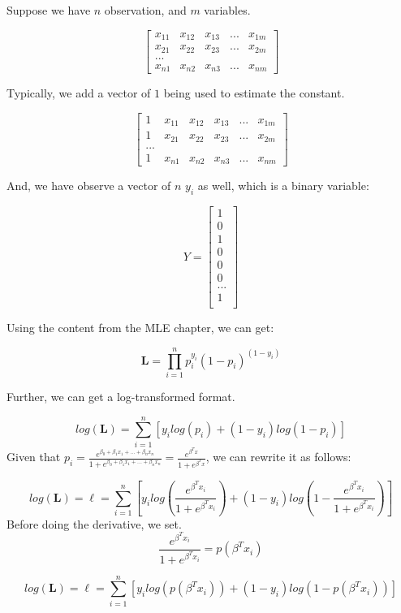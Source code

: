 \documentclass[]{book}
\begin{document}
Suppose we have \(n\) observation, and \(m\) variables.

\[\begin{bmatrix}
x_{11} & x_{12} & x_{13} & ... & x_{1m}\\
x_{21} & x_{22} & x_{23} & ... & x_{2m} \\
...\\
x_{n1} & x_{n2} & x_{n3} & ... & x_{nm}
\end{bmatrix}\]

Typically, we add a vector of \(1\) being used to estimate the constant.

\[\begin{bmatrix}
1 & x_{11} & x_{12} & x_{13} & ... & x_{1m}\\
1 & x_{21} & x_{22} & x_{23} & ... & x_{2m} \\
...\\
1 & x_{n1} & x_{n2} & x_{n3} & ... & x_{nm}
\end{bmatrix}\]

And, we have observe a vector of \(n\) \(y_i\) as well, which is a binary variable:

\[Y = \begin{bmatrix}1 \\
0 \\
1 \\
0 \\
0 \\
0 \\
...\\
1 \\
\end{bmatrix}\]

Using the content from the MLE chapter, we can get:

\[\mathbf{L}=\prod_{i=1}^{n} p_i^{ y_i}(1-p_i)^{(1-y_i)}\]

Further, we can get a log-transformed format.

\[log (\mathbf{L})=\sum_{i=1}^{n}[y_i log (p_i) + (1-y_i) log(1-p_i)]\]
Given that \(p_i=\frac{e^{\beta_0+\beta_1x_1+...+\beta_nx_n}}{1+e^{\beta_0+\beta_1x_1+...+\beta_nx_n}}=\frac{e^{\beta^Tx}}{1+e^{\beta^Tx}}\), we can rewrite it as follows:

\[log (\mathbf{L})=\ell=\sum_{i=1}^{n}[y_i log (\frac{e^{\beta^Tx_i}}{1+e^{\beta^Tx_i}}) + (1-y_i) log(1-\frac{e^{\beta^Tx_i}}{1+e^{\beta^Tx_i}})]\]
Before doing the derivative, we set.
\[\frac{e^{\beta^Tx_i}}{1+e^{\beta^Tx_i}} = p(\beta ^T x_i)\]

\[log (\mathbf{L})=\ell=\sum_{i=1}^{n}[y_i log (p(\beta ^T x_i)) + (1-y_i) log(1-p(\beta ^T x_i))]\]
\end{document}
